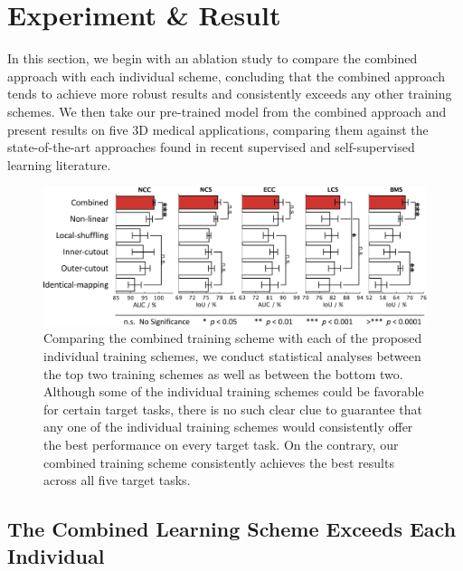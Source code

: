 \section{Experiment \& Result}
\label{ch5:experiments}


In this section, we begin with an ablation study to compare the combined approach with each individual scheme, concluding that the combined approach tends to achieve more robust results and consistently exceeds any other training schemes. We then take our pre-trained model from the combined approach and present results on five 3D medical applications, comparing them against the state-of-the-art approaches found in recent supervised and self-supervised learning literature.



\begin{figure}
\begin{center}
\includegraphics[width=0.9\columnwidth]{Figures/CH5/fig_combined_vs_individuals.pdf}
\end{center}
\caption[The Combined Learning Scheme Exceeds Each Individual]{
Comparing the combined training scheme with each of the proposed individual training schemes, we conduct statistical analyses between the top two training schemes as well as between the bottom two. Although some of the individual training schemes could be favorable for certain target tasks, there is no such clear clue to guarantee that any one of the individual training schemes would consistently offer the best performance on every target task. On the contrary, our combined training scheme consistently achieves the best results across all five target tasks.
}
\label{ch5:fig:combined_vs_individuals}
\end{figure}


\subsection{The Combined Learning Scheme Exceeds Each Individual}
\label{ch5:individual_combination}


